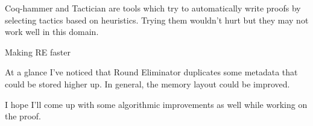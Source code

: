 \documentclass{article}
\begin{document}
Coq-hammer and Tactician are tools which try to automatically write proofs by selecting tactics based on heuristics. Trying them wouldn't hurt but they may not work well in this domain.

Making RE faster

At a glance I've noticed that Round Eliminator duplicates some metadata that could be stored higher up. In general, the memory layout could be improved.

I hope I'll come up with some algorithmic improvements as well while working on the proof.



\end{document}
